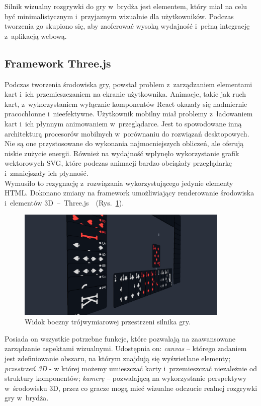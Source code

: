 Silnik wizualny rozgrywki do gry w~brydża jest elementem, który miał na celu
być minimalistycznym i~przyjaznym wizualnie dla użytkowników.
Podczas tworzenia go skupiono się, aby zaoferować
wysoką wydajność i~pełną integrację z~aplikacją webową.


\subsection{Framework Three.js}

Podczas tworzenia środowiska gry, powstał problem z~zarządzaniem
elementami kart i~ich przemieszczaniem na ekranie użytkownika. Animacje,
takie jak ruch kart, z~wykorzystaniem wyłącznie komponentów React
okazały się nadmiernie pracochłonne i~nieefektywne. Użytkownik
mobilny miał problemy z~ładowaniem kart
i~ich płynnym animowaniem w~przeglądarce. Jest to spowodowane inną architekturą procesorów
mobilnych w~porównaniu do rozwiązań desktopowych. Nie są one przystosowane
do wykonania najmocniejszych obliczeń, ale oferują niskie zużycie energii.
Również na wydajność wpłynęło wykorzystanie grafik wektorowych SVG,
które podczas animacji bardzo obciążały przeglądarkę i~zmniejszały
ich płynność. \\

Wymusiło to rezygnację z~rozwiązania wykorzystującego jedynie elementy HTML.
Dokonano zmiany na framework umożliwiający renderowanie
środowiska i~elementów
\mbox{3D -- Three.js~\cite{ThreeJS}~(Rys.~\ref{fig:engine_orbit})}.

\begin{figure}[hbt!]
    \centering
    \includegraphics[width=0.9\textwidth]{img/bridge-engine/orbit.png}
    \caption{Widok boczny trójwymiarowej przestrzeni silnika gry.}
    \label{fig:engine_orbit}
\end{figure}

Posiada on wszystkie potrzebne funkcje, które pozwalają na zaawansowane
zarządzanie aspektami wizualnymi. Udostępnia on:
\textit{canvas} -- którego zadaniem jest zdefiniowanie
obszaru, na którym znajdują się wyświetlane elementy;
\textit{przestrzeń 3D} - w której możemy umieszczać
karty i~przemieszczać niezależnie od struktury komponentów;
\textit{kamerę} -- pozwalającą na wykorzystanie perspektywy
w~środowisku 3D, przez co gracze mogą mieć wizualne
odczucie realnej rozgrywki gry w~brydża.

